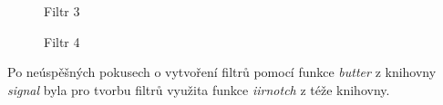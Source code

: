 \documentclass[a4paper,12pt]{article}
\begin{document}
\begin{figure}[h!]
\centering
\begin{minipage}{0.48\textwidth}
\caption{Filtr 3}
\end{minipage}
\hfill 
\begin{minipage}{0.48\textwidth}
\caption{Filtr 4}
\end{minipage}
\end{figure}

Po neúspěšných pokusech o vytvoření filtrů pomocí funkce \emph{butter} z knihovny \emph{signal} byla pro tvorbu filtrů využita funkce \emph{iirnotch} z téže knihovny.
\end{document}
